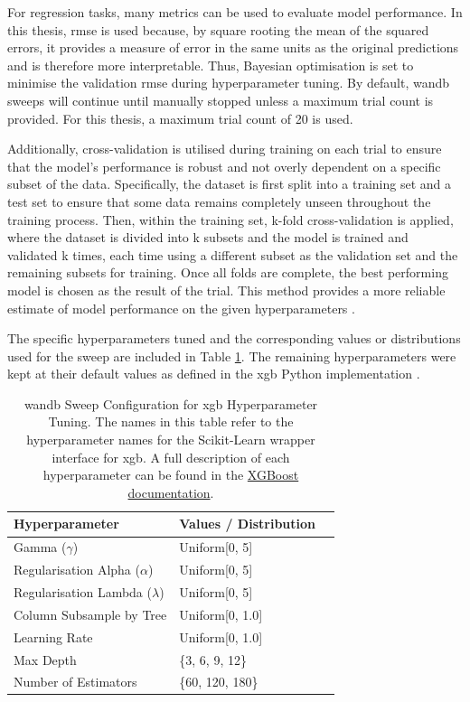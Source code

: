 For regression tasks, many metrics can be used to evaluate model performance. In this thesis, \acrfull{rmse} is used because, by square rooting the mean of the squared errors, it provides a measure of error in the same units as the original predictions and is therefore more interpretable. Thus, Bayesian optimisation is set to minimise the validation \acrshort{rmse} during hyperparameter tuning. By default, \acrshort{wandb} sweeps will continue until manually stopped unless a maximum trial count is provided. For this thesis, a maximum trial count of 20 is used. 

Additionally, cross-validation is utilised during training on each trial to ensure that the model's performance is robust and not overly dependent on a specific subset of the data. Specifically, the dataset is first split into a training set and a test set to ensure that some data remains completely unseen throughout the training process. Then, within the training set, k-fold cross-validation is applied, where the dataset is divided into k subsets and the model is trained and validated k times, each time using a different subset as the validation set and the remaining subsets for training. Once all folds are complete, the best performing model is chosen as the result of the trial. This method provides a more reliable estimate of model performance on the given hyperparameters .

The specific hyperparameters tuned and the corresponding values or distributions used for the sweep are included in Table \ref{tab:wandb-sweep-config}. The remaining hyperparameters were kept at their default values as defined in the \acrshort{xgb} Python implementation .

\begin{table}[!ht]
    \centering
    \caption{\acrshort{wandb} Sweep Configuration for \acrshort{xgb} Hyperparameter Tuning. The names in this table refer to the hyperparameter names for the Scikit-Learn wrapper interface for \acrshort{xgb}. A full description of each hyperparameter can be found in the \href{https://xgboost.readthedocs.io/en/stable/python/python_api.html\#module-xgboost.sklearn}{XGBoost documentation}.}
    \label{tab:wandb-sweep-config}
    \begin{tabular}{llr}     
        \toprule
        \textbf{Hyperparameter} & \textbf{Values / Distribution} \\ 
        \midrule
        Gamma ($\gamma$) & Uniform[0, 5] \\
        Regularisation Alpha ($\alpha$) & Uniform[0, 5] \\
        Regularisation Lambda ($\lambda$) & Uniform[0, 5] \\
        Column Subsample by Tree & Uniform[0, 1.0] \\
        Learning Rate & Uniform[0, 1.0] \\
        Max Depth & \{3, 6, 9, 12\} \\
        Number of Estimators & \{60, 120, 180\} \\
        \bottomrule
    \end{tabular}
\end{table}

